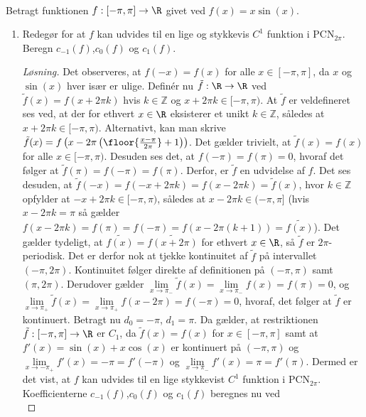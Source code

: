 \setcounter{section}{4}

\begin{opg}\hfill \\
	Betragt funktionen $ f:[-\pi,\pi]\to \R $ givet ved $ f(x)=x\sin(x) $.
	\begin{enumerate}
		\item Redegør for at $ f $ kan udvides til en lige og stykkevis $ C^1 $ funktion i $ \text{PCN}_{2\pi} $. Beregn $ c_{-1}(f) $,$ c_0(f) $ og $ c_1(f) $.
		\ifanswers
		\begin{proof}[Løsning]
			Det observeres, at $ f(-x)=f(x) $ for alle $ x\in[-\pi,\pi] $, da $ x $ og $ \sin(x) $ hver især er ulige. Definér nu $ \tilde{f}:\R\to\R $ ved $ \tilde{f}(x)=f(x+2\pi k) $ hvis $ k\in\mathbb{Z} $ og $ x+2\pi k\in[-\pi,\pi) $. At $ \tilde{f} $ er veldefineret ses ved, at der for ethvert $ x\in\R $ eksisterer et unikt $ k\in\mathbb{Z} $, således at $ x+2\pi k\in [-\pi,\pi) $. Alternativt, kan man skrive $ \tilde{f}(x)=f\left(x-2\pi\left(\floor{\frac{x-\pi}{2\pi}}+1\right)\right) $.
			Det gælder trivielt, at $ \tilde{f}(x)=f(x) $ for alle $ x\in[-\pi,\pi) $. Desuden ses det, at $ f(-\pi)=f(\pi)=0 $, hvoraf det følger at $ \tilde{f}(\pi)=f(-\pi)=f(\pi) $. Derfor, er $ \tilde{f} $ en udvidelse af $ f $. Det ses desuden, at $ \tilde{f}(-x)=f(-x+2\pi k)=f(x-2\pi k)=\tilde{f}(x) $, hvor $ k\in\mathbb{Z} $ opfylder at $ -x+2\pi k\in[-\pi,\pi) $, således at $ x-2\pi k\in(-\pi,\pi] $ (hvis $ x-2\pi k=\pi $ så gælder $ f(x-2\pi k)=f(\pi)=f(-\pi)=f(x-2\pi(k+1))=\tilde{f(x)} $). Det gælder tydeligt, at $ \tilde{f(x)}=\tilde{f(x+2\pi)} $ for ethvert $ x\in\R $, så $ \tilde{f} $ er $ 2\pi $-periodisk. Det er derfor nok at tjekke kontinuitet af $ \tilde{f} $ på intervallet $ (-\pi,2\pi) $. Kontinuitet følger direkte af definitionen på $ (-\pi,\pi) $ samt $ (\pi,2\pi) $. Derudover gælder $ \lim\limits_{x\to\pi_-}\tilde{f}(x)=\lim\limits_{x\to\pi_-}f(x)=f(\pi)=0 $, og $ \lim\limits_{x\to\pi_+}\tilde{f}(x)=\lim\limits_{x\to\pi_+}f(x-2\pi)=f(-\pi)=0 $, hvoraf, det følger at $ \tilde{f} $ er kontinuert. Betragt nu $ d_0=-\pi $, $ d_1=\pi $. Da gælder, at restriktionen $ \tilde{f}:[-\pi,\pi]\to\R $ er $ C_1 $, da $ \tilde{f}(x)=f(x) $ for $ x\in[-\pi,\pi] $ samt at $ f'(x)=\sin(x)+x\cos(x) $ er kontinuert på $ (-\pi,\pi) $ og $ \lim\limits_{x\to-\pi_+}f'(x)=-\pi=f'(-\pi) $ og $ \lim\limits_{x\to\pi_-}f'(x)=\pi=f'(\pi) $. Dermed er det vist, at $ f $ kan udvides til en lige stykkevist $ C^1 $ funktion i $ \text{PCN}_{2\pi} $.
			Koefficienterne $ c_{-1}(f) $,$ c_0(f) $ og $ c_1(f) $ beregnes nu ved \begin{equation*}

\end{equation*}
\end{proof}
\end{enumerate}
\end{opg}
